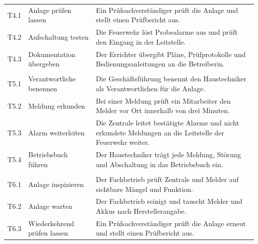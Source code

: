 \begin{small}
\begin{longtable}{@{}>{\raggedright\arraybackslash}p{1.0cm}>{\raggedright\arraybackslash}p{3.6cm}>{\raggedright\arraybackslash}p{10.0cm}@{}}
T4.1 & Anlage prüfen lassen & Ein Prüfsachverständiger prüft die Anlage und stellt einen Prüfbericht aus. \\
T4.2 & Aufschaltung testen & Die Feuerwehr löst Probealarme aus und prüft den Eingang in der Leitstelle. \\
T4.3 & Dokumentation übergeben & Der Errichter übergibt Pläne, Prüfprotokolle und Bedienungsanleitungen an die Betreiberin. \\
\multicolumn{3}{@{}l}{\textbf{TP5 Betreiben}} \\
T5.1 & Verantwortliche benennen & Die Geschäftsführung benennt den Haustechniker als Verantwortlichen für die Anlage. \\
T5.2 & Meldung erkunden & Bei einer Meldung prüft ein Mitarbeiter den Melder vor Ort innerhalb von drei Minuten. \\
T5.3 & Alarm weiterleiten & Die Zentrale leitet bestätigte Alarme und nicht erkundete Meldungen an die Leitstelle der Feuerwehr weiter. \\
T5.4 & Betriebsbuch führen & Der Haustechniker trägt jede Meldung, Störung und Abschaltung in das Betriebsbuch ein. \\
\multicolumn{3}{@{}l}{\textbf{TP6 Instandhalten}} \\
T6.1 & Anlage inspizieren & Der Fachbetrieb prüft Zentrale und Melder auf sichtbare Mängel und Funktion. \\
T6.2 & Anlage warten & Der Fachbetrieb reinigt und tauscht Melder und Akkus nach Herstellerangabe. \\
T6.3 & Wiederkehrend prüfen lassen & Ein Prüfsachverständiger prüft die Anlage erneut und stellt einen Prüfbericht aus. \\
\end{longtable}\end{small}
